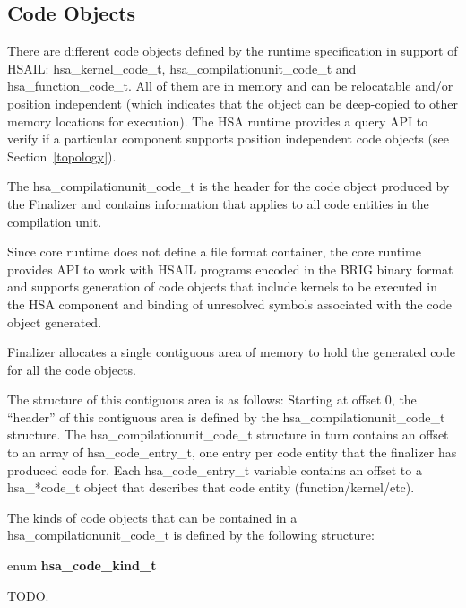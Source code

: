 \documentclass{book}
\newcommand{\hsadef}[2]{\hypertarget{#1}{\textbf{#2}}}
\newcommand{\reftyp}[1]{#1}
\begin{document}
\begin{appendices}
\subsection{Code Objects}\label{finalize:codeobject}

There are different code objects defined by the runtime specification
in support of HSAIL: \reftyp{hsa\_kernel\_code\_t},
\reftyp{hsa\_compilationunit\_code\_t} and
\reftyp{hsa\_function\_code\_t}.  All of them are in memory and can be
relocatable and/or position independent (which indicates that the
object can be deep-copied to other memory locations for
execution). The HSA runtime provides a query API to verify if a
particular component supports position independent code objects (see
Section~\ref{topology}).

The \reftyp{hsa\_compilationunit\_code\_t} is the header for the
code object produced by the Finalizer and contains information that
applies to all code entities in the compilation unit.

Since core runtime does not define a file format container, the core
runtime provides API to work with HSAIL programs encoded in the BRIG
binary format and supports generation of code objects that
include kernels to be executed in the HSA component and binding
of unresolved symbols associated with the code object
generated.

Finalizer allocates a single contiguous area of memory to hold the
generated code for all the code objects.

The structure of this contiguous area is as follows: Starting at
offset 0, the ``header'' of this contiguous area is defined by the
\reftyp{hsa\_compilationunit\_code\_t} structure. The
\reftyp{hsa\_compilationunit\_code\_t} structure in turn contains
an offset to an array of \reftyp{hsa\_code\_entry\_t}, one entry per
code entity that the finalizer has produced code for. Each
\reftyp{hsa\_code\_entry\_t} variable contains an offset to a
\reftyp{hsa\_*code\_t} object that describes that code entity
(function/kernel/etc).

The kinds of code objects that can be contained in a
\reftyp{hsa\_compilationunit\_code\_t} is defined by the following
structure:
\makeatletter{}

\noindent\begin{tcolorbox}[nobeforeafter,arc=0mm,colframe=white,colback=lightgray,left=0mm]
enum \hsadef{group__ENU__codekind_1ga085ebee59c730a7063cfe522b86f62d7}{hsa\_code\_kind\_t}
\end{tcolorbox}
TODO.


\end{appendices}
\end{document}
